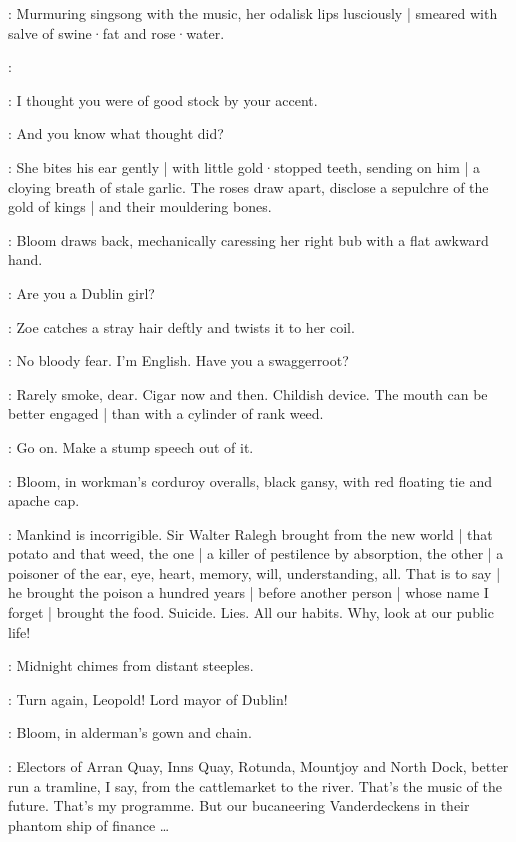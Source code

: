 :
Murmuring singsong with the music,
her odalisk lips lusciously |
smeared with salve of swine·fat and rose·water.

\Zoe:

\Bloom:
I thought you were of good stock by your accent.

\Zoe:
And you know what thought did?

:
She bites his ear gently |
with little gold·stopped teeth,
sending on him |
a cloying breath of stale garlic.
The roses draw apart,
disclose a sepulchre of the gold of kings |
and their mouldering bones.

:
Bloom draws back,
mechanically caressing her right bub with a flat awkward hand.

\Bloom:
Are you a Dublin girl?

:
Zoe catches a stray hair deftly and twists it to her coil.

\Zoe:
No bloody fear.
I'm English.
Have you a swaggerroot?

\Bloom:
Rarely smoke,
dear.
Cigar now and then.
Childish device.
The mouth can be better engaged |
than with a cylinder of rank weed.

\Zoe:
Go on.
Make a stump speech out of it.


\par

:
Bloom,
in workman's corduroy overalls,
black gansy,
with red floating tie and apache cap.

\Bloom:
Mankind is incorrigible.
Sir Walter Ralegh brought from the new world |
that potato and that weed,
the one |
a killer of pestilence by absorption,
the other |
a poisoner of the ear,
eye,
heart,
memory,
will,
understanding,
all.
That is to say |
he brought the poison a hundred years |
before another person |
whose name I forget |
brought the food.
Suicide.
Lies.
All our habits.
Why,
look at our public life!

:
Midnight chimes from distant steeples.

\Chimes:
Turn again,
Leopold!
Lord mayor of Dublin!

:
Bloom,
in alderman's gown and chain.

\Bloom:
Electors of Arran Quay,
Inns Quay,
Rotunda,
Mountjoy and North Dock,
better run a tramline,
I say,
from the cattlemarket to the river.
That's the music of the future.
That's my programme.
But our bucaneering Vanderdeckens in their phantom ship of finance \ldots%

